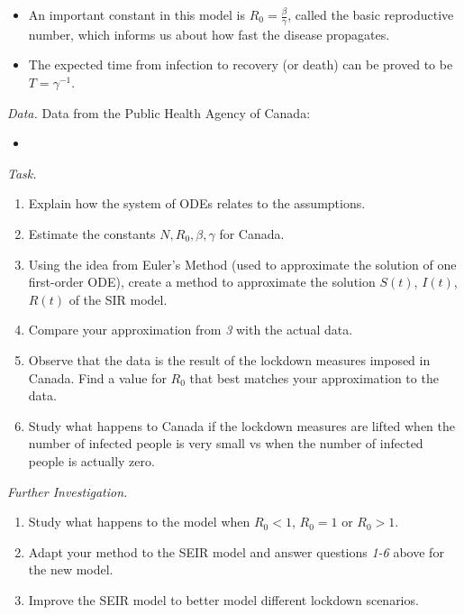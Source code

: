 \begin{important}
\begin{itemize}
\item An important constant in this model is $R_0 = \frac{\beta}{\gamma}$, called the basic reproductive number, which informs us about how fast the disease propagates.
\item The expected time from infection to recovery (or death) can be proved to be $T = \gamma^{-1}$.
\end{itemize}
\end{important}



\newpage

\begin{graybox}
\emph{Data. } Data from the Public Health Agency of Canada:
\begin{itemize}
	\item {}
\end{itemize}
\end{graybox}


\vspace{1cm}

\emph{Task. } 

\begin{enumerate}[label=\emph{\arabic*.}]
\item Explain how the system of ODEs relates to the assumptions.
\item Estimate the constants $N, R_0, \beta, \gamma$ for Canada.
\item Using the idea from Euler's Method (used to approximate the solution of one first-order ODE), create a method to approximate the solution $S(t)$, $I(t)$, $R(t)$ of the SIR model.
\item Compare your approximation from \emph{3} with the actual data.
\item Observe that the data is the result of the lockdown measures imposed in Canada. Find a value for $R_0$ that best matches your approximation to the data.
\item Study what happens to Canada if the lockdown measures are lifted when the number of infected people is very small vs when the number of infected people is actually zero.
\end{enumerate}




\vfill


\emph{Further Investigation. } 
\begin{enumerate}[label=\emph{\arabic*.}]
\item Study what happens to the model when $R_0<1$, $R_0=1$ or $R_0>1$.
\item Adapt your method to the SEIR model and answer questions \emph{1-6} above for the new model.
\item Improve the SEIR model to better model different lockdown scenarios.

\end{enumerate}

\begin{noexercises}
\end{noexercises}

